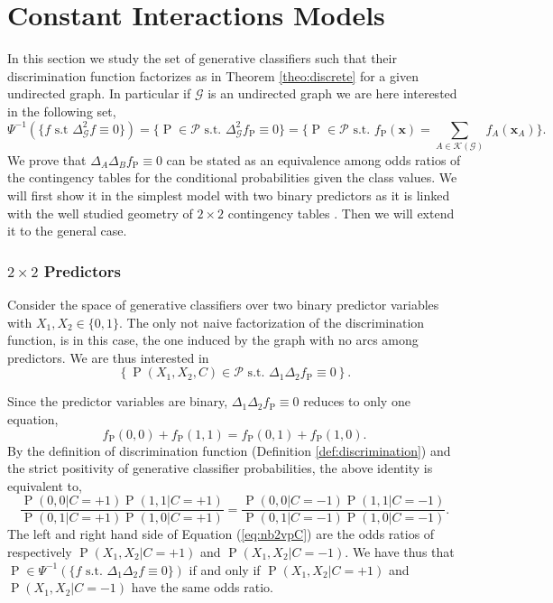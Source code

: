 \documentclass[11pt,a4paper, twoside]{book}
\newcommand{\Pp}{\operatorname{P}}
\newcommand{\bx}{\mathbf{x}}
\begin{document}
\section{Constant Interactions Models}
\label{sec:constantinteraction}
In this section we study the set of generative classifiers such that their discrimination function factorizes as in Theorem \ref{theo:discrete} for a given undirected graph. 
In particular if $\mathcal{G}$ is an undirected graph we are here interested in the following set,
$$ \Psi^{-1}(\{ f \text{ s.t } \Delta^{2}_{\mathcal{G}}f\equiv 0 \})= \{ \Pp \in \mathcal{P} \text{ s.t. } \Delta^{2}_{\mathcal{G}}f_{\Pp} \equiv 0 \}=\{ \Pp \in \mathcal{P} \text{ s.t. } f_{\Pp}(\bx) = \sum_{A \in \mathcal{K}(\mathcal{G})} f_{A}(\bx_A)  \}.$$ 
We prove that $\Delta_A\Delta_Bf_{\Pp} \equiv 0 $ can be stated as an equivalence among odds ratios of the contingency tables for the conditional probabilities given the class values.
We will first show it in the simplest model with two binary predictors as it is linked with the well studied geometry of $2\times 2$ contingency tables \citep{fienberg70}. Then we will extend it to the general case.

\subsubsection{$2 \times 2$ Predictors}

Consider the space of generative classifiers over two binary predictor variables with $X_1,X_2 \in \{0,1\}$.
The only not naive factorization of the discrimination function, is in this case, the one induced by the graph with no arcs among predictors.
We are thus interested in
$$\left\{\Pp(X_1,X_2,C) \in \mathcal{P} \text{ s.t. } \Delta_1\Delta_2f_{\Pp} \equiv 0 \right\}.$$ 

Since the predictor variables are binary, $\Delta_1\Delta_2f_{\Pp}\equiv 0 $ reduces to only one equation, 
$$
f_{\Pp}(0,0) + f_{\Pp}(1,1) = f_{\Pp}(0,1) + f_{\Pp}(1,0).
$$
By the definition of discrimination function (Definition \ref{def:discrimination}) and the strict positivity of generative classifier probabilities, the above identity is equivalent to,
\begin{equation}
\frac{\Pp(0,0|C=+1)\Pp(1,1|C=+1)}{\Pp(0,1|C=+1)\Pp(1,0|C=+1)}=\frac{\Pp(0,0|C=-1)\Pp(1,1|C=-1)}{\Pp(0,1|C=-1)\Pp(1,0|C=-1)}.
\label{eq:nb2vpC}
\end{equation}
The left and right hand side of Equation (\ref{eq:nb2vpC}) are the odds ratios \citep{fienberg1968, carlini2005} of respectively $\Pp(X_1,X_2|C=+1)$ and $\Pp(X_1,X_2|C=-1)$.
We have thus that $\Pp \in \Psi^{-1}\left( \{ f \text{ s.t. } \Delta_1 \Delta_2 f \equiv 0   \} \right)$ if and only if $\Pp(X_1,X_2|C=+1)$ and $\Pp(X_1,X_2|C=-1)$ have the same odds ratio.
\end{document}
